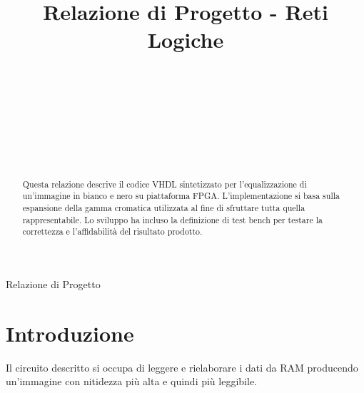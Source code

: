 \documentclass{article}
\begin{document}
\title{Relazione di Progetto - Reti Logiche%
%
}

\author{\\[2pt] 
\\
\\
\and
\\
\\
\\
}

%
%
{Relazione di Progetto} 

\maketitle

\begin{abstract}
Questa relazione descrive il codice VHDL sintetizzato per l'equalizzazione di un'immagine in bianco e nero su piattaforma FPGA. L'implementazione si basa sulla espansione della gamma cromatica utilizzata al fine di sfruttare tutta quella rappresentabile. Lo sviluppo ha incluso la definizione di test bench per testare la correttezza e l'affidabilità del risultato prodotto. 
\end{abstract}

\section{Introduzione}
\label{intro}
Il circuito descritto si occupa di leggere e rielaborare i dati da RAM producendo un'immagine con nitidezza più alta e quindi più leggibile. 
\end{document}

